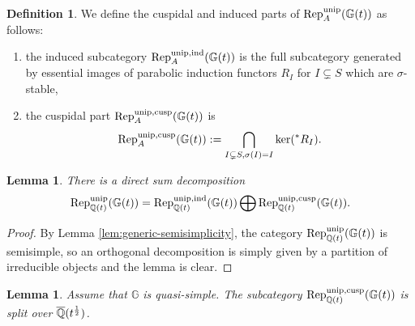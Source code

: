 \documentclass[a4paper, 10pt, oneside, reqno]{amsart}
\theoremstyle{plain}
\newtheorem{lem}[thm]{Lemma}
\theoremstyle{definition}
\newtheorem{defi}[thm]{Definition}
\theoremstyle{remark}
\newcommand{\Gbb}{\mathbb{G}}
\begin{document}
\begin{defi}
We define the cuspidal and induced parts of $\Rep_A^{\unip}(\Gbb(t))$ as follows: 
\begin{enumerate}
\item the induced subcategory $\Rep_A^{\unip, \ind}(\Gbb(t))$ is the full subcategory generated by essential images of parabolic induction functors $R_I$ for $I \subsetneq S$ which are $\sigma$-stable, 
\item the cuspidal part $\Rep_A^{\unip, \cusp}(\Gbb(t))$ is 
$$\Rep_A^{\unip, \cusp}(\Gbb(t)) := \bigcap_{I \subsetneq S, \sigma(I) = I}\ker({^*}R_I).$$
\end{enumerate}
\end{defi}

\begin{lem}
There is a direct sum decomposition
$$\Rep_{\Q(t)}^{\unip}(\Gbb(t)) = \Rep_{\Q(t)}^{\unip, \ind}(\Gbb(t)) \bigoplus \Rep_{\Q(t)}^{\unip, \cusp}(\Gbb(t)).$$
\end{lem}

\begin{proof}
By Lemma \ref{lem:generic-semisimplicity}, the category $\Rep_{\Q(t)}^{\unip}(\Gbb(t))$ is semisimple, so an orthogonal decomposition is simply given by a partition of irreducible objects and the lemma is clear.
\end{proof}

\begin{lem}\label{lem:cuspidal-represenation-splitting-field}
Assume that $\Gbb$ is quasi-simple. The subcategory $\Rep_{\Q(t)}^{\unip, \cusp}(\Gbb(t))$ is split over $\overline{\mathbb{Q}}(t^{\frac{1}{2}})$.
\end{lem}
\end{document}

